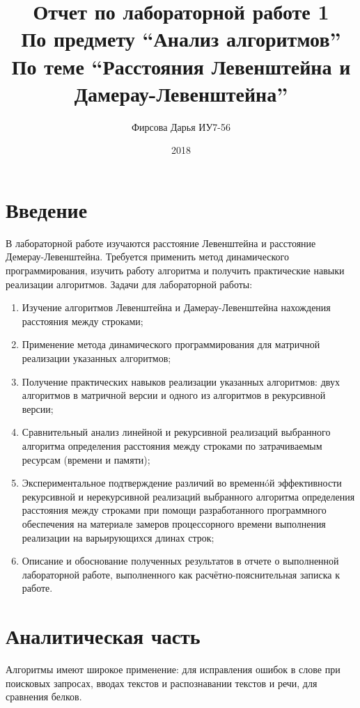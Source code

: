 \documentclass[12pt]{article}
\title{Отчет по лабораторной работе 1 \\ 
	По предмету “Анализ алгоритмов” \\
	По теме “Расстояния Левенштейна и Дамерау-Левенштейна”
}
\date{2018}
\author{Фирсова Дарья ИУ7-56}
\begin{document}
  
  \maketitle  
  \newpage
\section*{Введение}
В лабораторной работе изучаются расстояние Левенштейна и расстояние Демерау-Левенштейна. Требуется применить метод динамического программирования,  изучить работу алгоритма и получить практические навыки реализации алгоритмов. Задачи для лабораторной работы: 
\begin{enumerate}
\item  Изучение алгоритмов Левенштейна и Дамерау-Левенштейна нахождения расстояния между строками;
\item Применение метода динамического программирования для матричной реализации указанных алгоритмов;
\item Получение практических навыков реализации указанных алгоритмов: двух алгоритмов в матричной версии и одного из алгоритмов в рекурсивной версии;
\item Сравнительный анализ линейной и рекурсивной реализаций выбранного алгоритма определения расстояния между строками по затрачиваемым ресурсам (времени и памяти);
\item Экспериментальное подтверждение различий во временнóй эффективности рекурсивной и нерекурсивной реализаций выбранного алгоритма определения расстояния между строками при помощи разработанного программного обеспечения на материале замеров процессорного времени выполнения реализации на варьирующихся длинах строк;
\item Описание и обоснование полученных результатов в отчете о выполненной лабораторной работе, выполненного как расчётно-пояснительная записка к работе.
\end{enumerate}
\newpage
\section{Аналитическая часть}
Алгоритмы имеют широкое применение: для исправления ошибок в слове при поисковых запросах, вводах текстов и распознавании текстов и речи, для сравнения белков.
\end{document}
